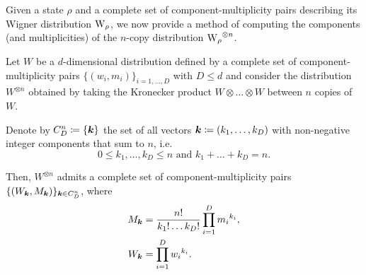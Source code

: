 \documentclass[pra,
aps,
twocolumn,
superscriptaddress,
groupedaddress,
nofootinbib,
reprint
]{revtex4-1}
\begin{document}
Given a state $\rho$ and a complete set of component-multiplicity pairs describing its Wigner distribution $\W{\rho}$, we now provide a method of computing the components (and multiplicities) of the $n$-copy distribution $\W{\rho}^{\otimes n}$.
\begin{lemma}\label{lem:ncopycomponents}
	Let $W$ be a $d$-dimensional distribution defined by a complete set of component-multiplicity pairs $\{(w_i, m_i)\}_{i=1,\dots,D}$ with $D \leq d$ and consider the distribution $W^{\otimes n}$ obtained by taking the Kronecker product $W \otimes \dots \otimes W$ between $n$ copies of $W$.
	
	Denote by $C_D^n \coloneqq \{\bm{k}\}$ the set of all vectors $\bm{k} \coloneqq (k_1, \dots, k_D)$ with non-negative integer components that sum to $n$, i.e.
	\begin{equation*}
	0 \leq k_1, \dots, k_D \leq n \text{ and } k_1 + \dots + k_D = n.
	\end{equation*}
	
	Then, $W^{\otimes n}$ admits a complete set of component-multiplicity pairs $\{(W_{\bm{k}}, M_{\bm{k}})\}_{\bm{k} \in C_D^n}$, where
\begin{align}
	M_{\bm{k}} &= \frac{n!}{k_1!\dots k_D!} \prod\limits_{i=1}^D {m_i}^{k_i}, \label{eq:M}\\
	W_{\bm{k}} &= \prod\limits_{i=1}^D {w_i}^{k_i}. \label{eq:W}
\end{align}
\end{lemma}
\end{document}
